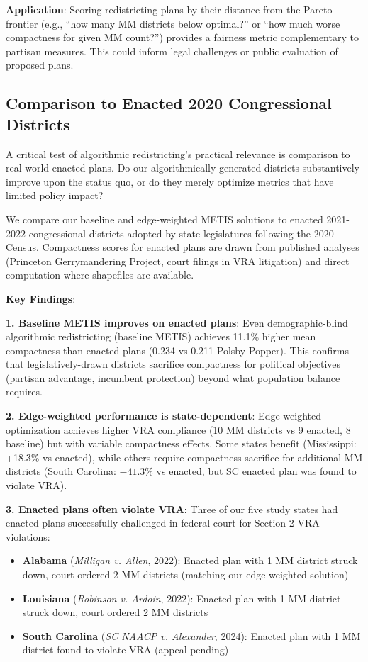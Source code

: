 \textbf{Application}: Scoring redistricting plans by their distance from the Pareto frontier (e.g., ``how many MM districts below optimal?'' or ``how much worse compactness for given MM count?'') provides a fairness metric complementary to partisan measures. This could inform legal challenges or public evaluation of proposed plans.

\subsection{Comparison to Enacted 2020 Congressional Districts}

A critical test of algorithmic redistricting's practical relevance is comparison to real-world enacted plans. Do our algorithmically-generated districts substantively improve upon the status quo, or do they merely optimize metrics that have limited policy impact?

We compare our baseline and edge-weighted METIS solutions to enacted 2021-2022 congressional districts adopted by state legislatures following the 2020 Census. Compactness scores for enacted plans are drawn from published analyses (Princeton Gerrymandering Project, court filings in VRA litigation) and direct computation where shapefiles are available.



\textbf{Key Findings}:

\textbf{1. Baseline METIS improves on enacted plans}: Even demographic-blind algorithmic redistricting (baseline METIS) achieves 11.1\% higher mean compactness than enacted plans (0.234 vs 0.211 Polsby-Popper). This confirms that legislatively-drawn districts sacrifice compactness for political objectives (partisan advantage, incumbent protection) beyond what population balance requires.

\textbf{2. Edge-weighted performance is state-dependent}: Edge-weighted optimization achieves higher VRA compliance (10 MM districts vs 9 enacted, 8 baseline) but with variable compactness effects. Some states benefit (Mississippi: +18.3\% vs enacted), while others require compactness sacrifice for additional MM districts (South Carolina: $-41.3$\% vs enacted, but SC enacted plan was found to violate VRA).

\textbf{3. Enacted plans often violate VRA}: Three of our five study states had enacted plans successfully challenged in federal court for Section 2 VRA violations:
\begin{itemize}
    \item \textbf{Alabama} (\emph{Milligan v. Allen}, 2022): Enacted plan with 1 MM district struck down, court ordered 2 MM districts (matching our edge-weighted solution)
    \item \textbf{Louisiana} (\emph{Robinson v. Ardoin}, 2022): Enacted plan with 1 MM district struck down, court ordered 2 MM districts
    \item \textbf{South Carolina} (\emph{SC NAACP v. Alexander}, 2024): Enacted plan with 1 MM district found to violate VRA (appeal pending)
\end{itemize}

